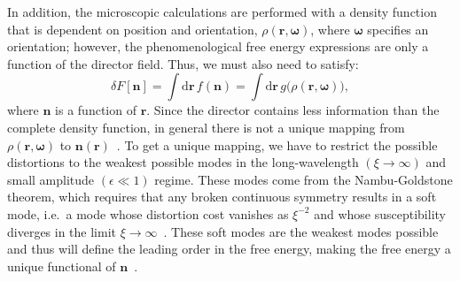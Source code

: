 In addition, the microscopic calculations are performed with a density function that is dependent on position and orientation, $\rho(\mathbf{r},\mathbf{\omega})$, where $\mathbf{\omega}$ specifies an orientation; however, the phenomenological free energy expressions are only a function of the director field.
Thus, we must also need to satisfy:
\begin{equation}
  \delta F[\mathbf{n}] = \int \textrm{d} \mathbf{r} \, f(\mathbf{n}) = \int \textrm{d} \mathbf{r} \, g \big ( \rho(\mathbf{r},\mathbf{\omega}) \big),\label{e:2-LessInfo}
\end{equation}
where $\mathbf{n}$ is a function of $\mathbf{r}$.
Since the director contains less information than the complete density function, in general there is not a unique mapping from  $\rho(\mathbf{r},\mathbf{\omega})$ to $\mathbf{n}(\mathbf{r})$~\cite{RN55}.
To get a unique mapping, we have to restrict the possible distortions to the weakest possible modes in the long-wavelength $(\xi \rightarrow \infty)$ and small amplitude $(\epsilon \ll 1)$ regime.
These modes come from the Nambu-Goldstone theorem, which requires that any broken continuous symmetry results in a soft mode, i.e.\ a mode whose distortion cost vanishes as $\xi^{-2}$ and whose susceptibility diverges in the limit $\xi \rightarrow \infty$~\cite{RN175,RN226,RN227,RN228}.
These soft modes are the weakest modes possible and thus will define the leading order in the free energy, making the free energy a unique functional of $\mathbf{n}$~\cite{RN55}. \\

